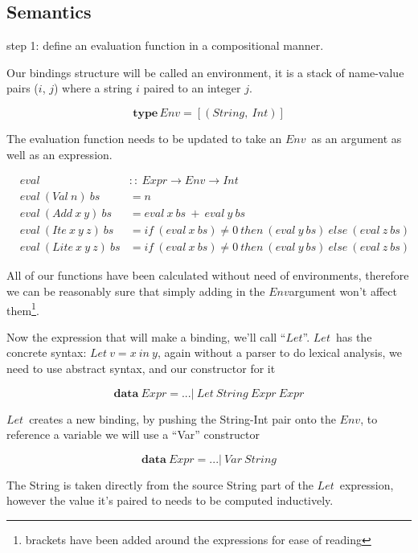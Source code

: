 \documentclass {article}
\begin{document}
\subsection{Semantics}

step 1: define an evaluation 
	function in a compositional manner.

Our bindings structure will be called
an environment, it is a stack
of name-value pairs ($i$, $j$) where
a string $i$ paired to an integer $j$.
\newcommand{\env}{$Env$}

	\[ \textbf{type} \, Env = [(String,\ Int)]\]

The evaluation function needs to be updated
to take an \env\ as an argument as well as
an expression.

\begin{eqnarray*}
	&eval              	   		&::\  Expr \rightarrow Env \rightarrow Int \\
	&eval\ (Val\ n)\ bs 		&=   n \\
	&eval\ (Add\ x\ y)\ bs		&=   eval\ x\ bs\ +\ eval\ y\ bs \\
	&eval\ (Ite\ x\ y\ z)\ bs	&=   if\ (eval\ x\ bs) \not= 0\ then\ (eval\ y\ bs)\ else\ (eval\ z\ bs) \\
	&eval\ (Lite\ x\ y\ z)\ bs 	&=   if\ (eval\ x\ bs) \not= 0\ then\ (eval\ y\ bs)\ else\ (eval\ z\ bs)
\end{eqnarray*}

All of our functions
have been calculated without need of environments,
therefore we can be reasonably sure that simply adding in the
\env argument won't affect them\footnote{
brackets have been added around the expressions for ease of reading}.

\newcommand{\lets}{$Let$}
\newcommand{\var}{$Var$}

Now the expression that will make a binding,
we'll call ``\lets''.
\lets\ has the concrete syntax:
\( Let\ v = x\ in\ y\),
again without a parser to do
lexical analysis, we need to use
abstract syntax, and our constructor
for it

	\[ \textbf{data} \ Expr = ... |\ Let \ String \ Expr \ Expr \]

\lets\ creates a new binding,
by pushing the String-Int pair
onto the \env, to reference a variable we will
use a ``Var'' constructor

\[ \textbf{data} \ Expr = ... |\ Var \ String \]

The String is taken directly from the source
String part of the \lets\ expression,
however the value it's paired to 
needs to be computed inductively.
\end{document}
